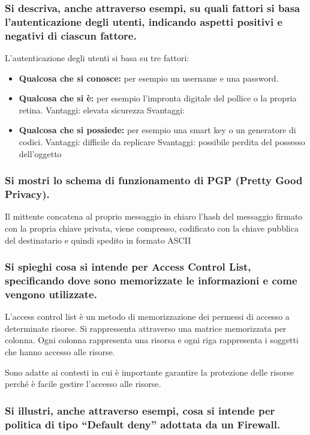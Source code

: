 \documentclass{article}
\begin{document}
\subsubsection*{Si descriva, anche attraverso esempi, su quali fattori si basa l’autenticazione degli utenti, indicando aspetti positivi e negativi di ciascun fattore. }

L'autenticazione degli utenti si basa su tre fattori:
    \begin{itemize}
        \item  \textbf{Qualcosa che si conosce:} per esempio un username e una password.
        \item \textbf{Qualcosa che si è:} per esempio l'impronta digitale del pollice o la propria retina.
        Vantaggi: elevata sicurezza
        Svantaggi: 
        \item  \textbf{Qualcosa che si possiede:} per esempio una smart key o un generatore di codici.
        Vantaggi: difficile da replicare
        Svantaggi: possibile perdita del possesso dell'oggetto
    \end{itemize}


\subsubsection*{Si mostri lo schema di funzionamento di PGP (Pretty Good Privacy).}

Il mittente concatena al proprio messaggio in chiaro l'hash del messaggio firmato con la propria chiave privata, viene compresso, codificato con la chiave pubblica del destinatario e quindi spedito in formato ASCII

\subsubsection*{Si spieghi cosa si intende per Access Control List, specificando dove sono memorizzate le informazioni e come vengono utilizzate.}

L'access control list è un metodo di memorizzazione dei permessi di accesso a determinate risorse.
Si rappressenta attraverso una matrice memorizzata per colonna.
Ogni colonna rappresenta una risorsa e ogni riga rappresenta i soggetti che hanno accesso alle risorse.

Sono adatte ai contesti in cui è importante garantire la protezione delle risorse perché è facile gestire l'accesso alle risorse.

\subsubsection*{Si illustri, anche attraverso esempi, cosa si intende per politica di tipo “Default deny” adottata da un Firewall.}
\end{document}
